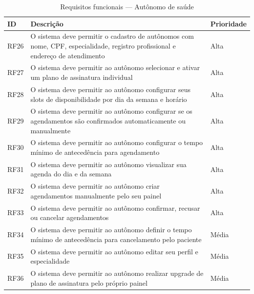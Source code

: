 \begin{table}[H]
  \centering
  \caption{Requisitos funcionais --- Autônomo de saúde}
  \label{tab:professional-requirements}
  \begin{tabular}{p{1.2cm}p{6.5cm}p{2.5cm}}
    \toprule
    \textbf{ID} &
    \textbf{Descrição} &
    \textbf{Prioridade} \\
    \midrule
    RF26 & O sistema deve permitir o cadastro de
           autônomos com nome, CPF, especialidade,
           registro profissional e endereço de
           atendimento
         & Alta \\
    RF27 & O sistema deve permitir ao autônomo
           selecionar e ativar um plano de
           assinatura individual
         & Alta \\
    RF28 & O sistema deve permitir ao autônomo
           configurar seus slots de disponibilidade
           por dia da semana e horário
         & Alta \\
    RF29 & O sistema deve permitir ao autônomo
           configurar se os agendamentos são
           confirmados automaticamente ou
           manualmente
         & Alta \\
    RF30 & O sistema deve permitir ao autônomo
           configurar o tempo mínimo de
           antecedência para agendamento
         & Alta \\
    RF31 & O sistema deve permitir ao autônomo
           visualizar sua agenda do dia e
           da semana
         & Alta \\
    RF32 & O sistema deve permitir ao autônomo
           criar agendamentos manualmente
           pelo seu painel
         & Alta \\
    RF33 & O sistema deve permitir ao autônomo
           confirmar, recusar ou cancelar
           agendamentos
         & Alta \\
    RF34 & O sistema deve permitir ao autônomo
           definir o tempo mínimo de antecedência
           para cancelamento pelo paciente
         & Média \\
    RF35 & O sistema deve permitir ao autônomo
           editar seu perfil e especialidade
         & Média \\
    RF36 & O sistema deve permitir ao autônomo
           realizar upgrade de plano de
           assinatura pelo próprio painel
         & Média \\
    \bottomrule
  \end{tabular}
\end{table}

